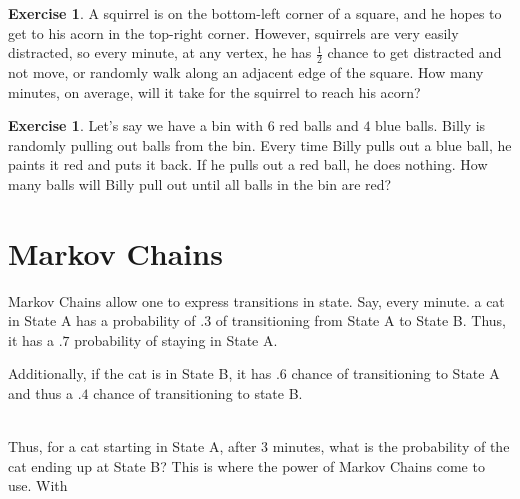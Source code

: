 \documentclass[letterpaper]{article}
\theoremstyle{definition}
\theoremstyle{remark}
\theoremstyle{definition}
\newtheorem{exercise}[thm]{Exercise}
\begin{document}
\begin{exercise}
    A squirrel is on the bottom-left corner of a square, and he hopes to get to his acorn in the top-right corner. However, squirrels are very easily distracted, so every minute, at any vertex, he has $\frac{1}{2}$ chance to get distracted and not move, or randomly walk along an adjacent edge of the square. How many minutes, on average, will it take for the squirrel to reach his acorn?
\end{exercise}

\begin{exercise}
    Let's say we have a bin with $6$ red balls and $4$ blue balls. Billy is randomly pulling out balls from the bin. Every time Billy pulls out a blue ball, he paints it red and puts it back. If he pulls out a red ball, he does nothing. How many balls will Billy pull out until all balls in the bin are red?
\end{exercise}

\section{Markov Chains}
Markov Chains allow one to express transitions in state. Say, every minute. a cat in State A has a probability of $.3$ of transitioning from State A to State B. Thus, it has a $.7$ probability of staying in State A.

Additionally, if the cat is in State B, it has $.6$ chance of transitioning to State A and thus a $.4$ chance of transitioning to state B.\\\\

\begin{center}
\end{center}

Thus, for a cat starting in State A, after 3 minutes, what is the probability of the cat ending up at State B? This is where the power of Markov Chains come to use. With 
\end{document}
